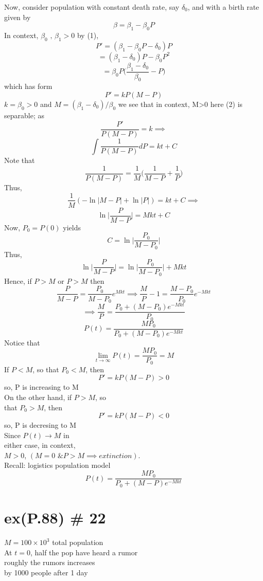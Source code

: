 \documentclass[10pt,a4paper]{article}
\begin{document}
  Now, consider population with constant 
  death rate, say \( \delta_0 \), and with a birth 
  rate given by 
  \[ \beta = \beta_1 - \beta_0P \]
  In context, \( \beta_0 \text{ , } \beta_1 > 0 \) by (1),
  \[ P' = ( \beta_1 - \beta_0 P -\delta_0 ) P\] 
  \[  = ( \beta_1 - \delta_0 ) P - \beta_0 P^2 \]
  \[ = \beta_0 P \Big( \frac{ \beta_1-\delta_0}{\beta_0} -P \Big) \]
  which has form 
  \[ P' =  kP(M-P) \]
  \( k = \beta_0 > 0 \) and \( M = (\beta_1 -\delta_0)/ \beta_0  \) we
  see that in context, M>0 here (2) 
  is separable; as 
  \[ \frac{P'}{P(M-P)} =k \implies  \]
  \[ \int \frac{1}{P(M-P)}dP = kt + C \]
  Note that
  \[ \frac{1}{P(M-P)} = \frac{1}{M} \bigg( \frac{1}{M-P} +
  \frac{1}{P}\bigg) \]
  Thus, 
  \[ \frac{1}{M} (- \ln | M-P| + \ln|P|) = kt + C \implies  \]
  \[ \ln \bigg| \frac{P}{M-P} \bigg| = Mkt + C \]
  Now, \( P_0 = P(0) \) yields 
  \[ C = \ln \bigg| \frac{P_0}{M - P_0}\bigg|  \]
  Thus,
  \[ \ln \Big| \frac{P}{M-P} \bigg| = \ln \bigg| \frac{P_0}{M - P_0}\Big| + Mkt\]
  Hence, if \( P > M \) or \( P > M \) then  
  \[  \frac{P}{M-P} = \frac{P_0}{M - P_0} e^{Mkt} \implies \frac{M}{P}
  -1 =  \frac{M - P_0}{P_0} e^{-Mkt}\]
  \[ \implies  \frac{M}{P} = \frac{P_0 + (M-P_0)e^{-Mkt}}{P_0} \]
  \[ \boxed{P(t) = \frac{MP_0}{P_0 + (M-P_0)e^{-Mkt}} } \]
  Notice that
  \[ \lim_{t \to \infty} P(t) = \frac{MP_0}{P_0} = M \]
  If \( P<M \), so that \( P_0 < M \), then
  \[ P' = kP(M-P) > 0 \]
  so, P is increasing to M \\[5mm]
  On the other hand, if \( P > M \), so \\
  that \( P_0>M \), then 
  \[ P' = kP(M-P) <0 \]
  so, P is decresing to M \\
  Since \( P(t) \to M \) in \\
  either case, in context,  \\
  \( M>0 \), \(  ( M = 0 \text{ \& } P>M \implies extinction) \). \\

  \newpage  
  Recall: logistics population model 
  \[ P(t) = \frac{MP_0}{P_0 + (M - P)e^{-Mkt}} \]

\section*{ex(P.88) \# 22}
  \(M=100 \times 10^3 \) total population \\
  At \( t=0 \), half the pop have heard a rumor \\
  roughly the rumors increases \\
  by 1000 people after 1 day \\ 
\end{document}
